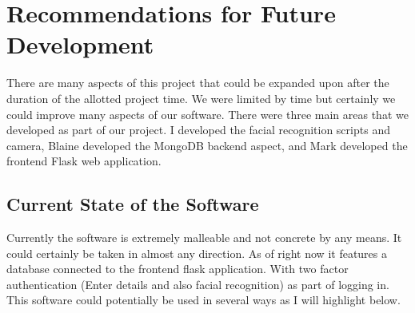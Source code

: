 \documentclass{article}
\begin{document}
\newpage

\section{Recommendations for Future Development}
There are many aspects of this project that could be expanded upon after the duration of the allotted project time. We were limited by time but certainly we could improve many aspects of our software. There were three main areas that we developed as part of our project. I developed the facial recognition scripts and camera, Blaine developed the \cite{mongodb}MongoDB backend aspect, and Mark developed the frontend Flask web
application.
\\
\subsection{Current State of the Software}
Currently the software is extremely malleable and not concrete by any means. It could certainly be taken in almost any direction. As of right now it features a database connected to the frontend flask application. With two factor authentication (Enter details and also facial recognition) as part of logging in. This software could potentially be used in several ways as I will highlight below.
\end{document}
